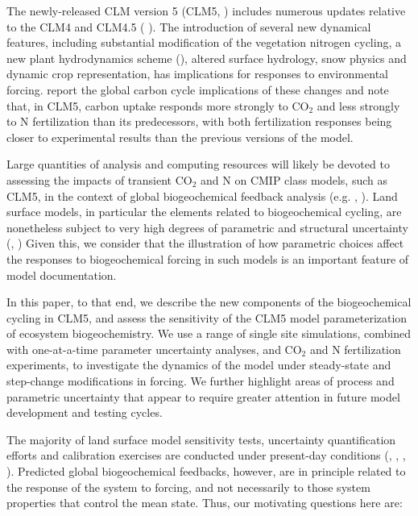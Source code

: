 \documentclass[draft,linenumbers]{agujournal}
\begin{document}
The newly-released CLM version 5  (CLM5, \cite{lawrence2018}) includes numerous updates relative to the CLM4 and CLM4.5  (\cite{oleson2013} ). The introduction of several new dynamical features, including substantial modification of the vegetation nitrogen cycling, a new plant hydrodynamics scheme (\cite{kennedy2019}), altered surface hydrology, snow physics and dynamic crop representation, has implications for responses to environmental forcing. \cite{wieder2019} report the global carbon cycle implications of these changes and note that, in CLM5, carbon uptake responds more strongly to CO$_{2}$ and less strongly to N fertilization than its predecessors, with both fertilization responses being closer to experimental results than the previous versions of the model. 

Large quantities of analysis and computing resources will likely be devoted to assessing the impacts of transient CO$_{2}$ and N on CMIP class models, such as CLM5, in the context of global biogeochemical feedback analysis (e.g. \cite{arora2013}, \cite{friedlingstein2014}). Land surface models, in particular the elements related to biogeochemical cycling, are nonetheless subject to very high degrees of parametric and structural uncertainty (\cite{bonan2018}, \cite{zaehle2014}) Given this,  we consider that the illustration of how parametric choices affect the responses to biogeochemical forcing in such models is an important feature of model documentation.

In this paper, to that end, we describe the new components of the biogeochemical cycling in CLM5, and assess the sensitivity of the CLM5 model parameterization of ecosystem biogeochemistry. We use a range of single site simulations, combined with one-at-a-time parameter uncertainty analyses, and CO$_{2}$ and N fertilization experiments, to investigate the dynamics of the model under steady-state and step-change modifications in forcing. We further highlight areas of process and parametric uncertainty that appear to require greater attention in future model development and testing cycles.

The majority of land surface model sensitivity tests, uncertainty quantification efforts and calibration exercises are conducted under present-day conditions (\cite{fer2018}, \cite{lu2018}, \cite{dietze2014}, \cite{ricciuto2018}). Predicted global biogeochemical feedbacks, however, are in principle related to the response of the system to forcing, and not necessarily to those system properties that control the mean state.  Thus, our motivating questions here are:
\end{document}
